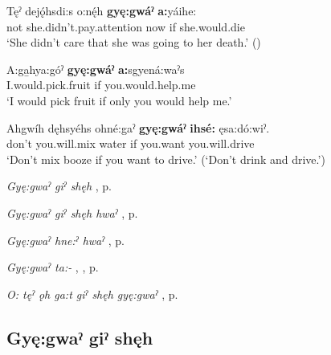 \ea
\label{ex:gpar138}
\gll Tęˀ dejǫ́hsdi:s o:nę́h \textbf{gyę:gwáˀ} \textbf{a:}yáihe:\\
not she.didn’t.pay.attention now if she.would.die\\
\glt ‘She didn’t care that she was going to her death.’ (\cite{carrier_legends_2013})
\z

\ea
\label{ex:gpar139}
\gll A:ga̱hya:góˀ \textbf{gyę:gwáˀ} \textbf{a:}sgyená:waˀs\\
I.would.pick.fruit if you.would.help.me\\
\glt ‘I would pick fruit if only you would help me.’
\z

\ea
\label{ex:gpar140}
\gll Ahgwíh dęhsyéhs ohné:gaˀ \textbf{gyę:gwáˀ} \textbf{ihsé:} ęsa:dó:wiˀ.\\
don’t you.will.mix water if you.want you.will.drive\\
\glt ‘Don’t mix booze if you want to drive.’ (`Don’t drink and drive.’)
\z

\begin{CayugaRelated}
\item \textit{Gyę:gwaˀ giˀ shęh} , p. \pageref{p:[gyę:gwaˀ giˀ shęh]}\\
\item \textit{Gyę:gwaˀ giˀ shęh hwaˀ} , p. \pageref{p:[gyę:gwaˀ giˀ shęh hwaˀ]}\\
\item \textit{Gyę:gwaˀ hne:ˀ hwaˀ} , p. \pageref{p:[gyę:gwaˀ hne:ˀ hwaˀ]}\\
\item \textit{Gyę:gwaˀ ta:-} , , p. \pageref{p:[gyę:gwaˀ ta:- ]}\\
\item \textit{O: tęˀ ǫh ga:t giˀ shęh gyę:gwaˀ} , p. \pageref{p:[o: tęˀ ǫh ga:t giˀ shęh gyę:gwaˀ]}
\end{CayugaRelated}


\subsection*{\textbf{Gyę:gwaˀ giˀ shęh} } \label{p:[gyę:gwaˀ giˀ shęh]}

